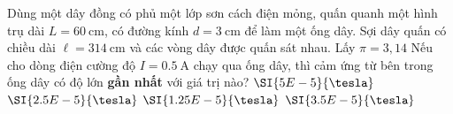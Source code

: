 \begin{ex}
	Dùng một dây đồng có phủ một lớp sơn cách điện mỏng, quấn quanh một hình trụ dài $L = \SI{60}{\centi\meter}$, có đường kính $d =\SI{3}{\centi\meter}$ để làm một ống dây. Sợi dây quấn có chiều dài $\ell = \SI{314}{\centi\meter}$ và các vòng dây được quấn sát nhau. Lấy $\pi=3,14$ Nếu cho dòng điện cường độ $I = \SI{0.5}{\ampere}$ chạy qua ống dây, thì cảm ứng từ bên trong ống dây có độ lớn \textbf{gần nhất} với giá trị nào?
	\choice
	{$\SI{5E-5}{\tesla}$}
	{$\SI{2.5E-5}{\tesla}$}
	{$\SI{1.25E-5}{\tesla}$}
	{\True $\SI{3.5E-5}{\tesla}$}
\end{ex}


